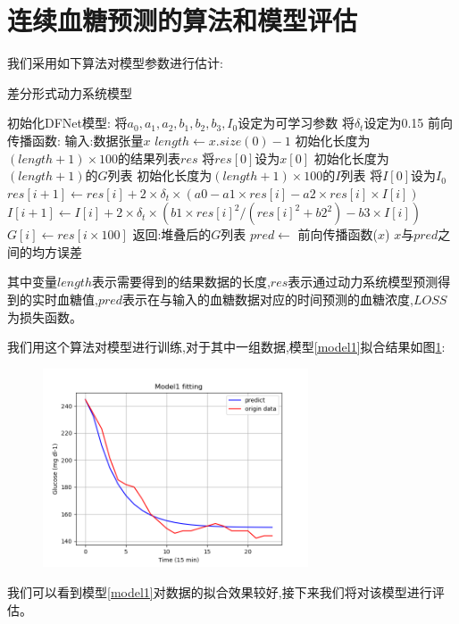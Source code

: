     
\section{连续血糖预测的算法和模型评估} 
我们采用如下算法对模型参数进行估计:
\begin{algorithm}[H]
    \caption{差分形式动力系统模型}
    \begin{algorithmic}[1]
    \State 初始化DFNet模型:
    \State \quad 将$a_0, a_1, a_2, b_1, b_2, b_3, I_0$设定为可学习参数
    \State \quad 将$\delta_t$设定为0.15
    \State 前向传播函数:
    \State \quad 输入:数据张量$x$
    \State \quad $length \gets x.size(0) - 1$
    \State \quad 初始化长度为$(length + 1) \times 100$的结果列表$res$
    \State \quad 将$res[0]$设为$x[0]$
    \State \quad 初始化长度为$(length + 1)$的$G$列表
    \State \quad 初始化长度为$(length + 1) \times 100$的$I$列表
    \State \quad 将$I[0]$设为$I_0$
        \State $res[i + 1] \gets res[i] + 2 \times \delta_t \times (a0 - a1 \times res[i] - a2 \times res[i] \times I[i])$
        \State $I[i + 1] \gets I[i] + 2 \times \delta_t \times (b1 \times res[i]^2 / (res[i]^2 + b2^2) - b3 \times I[i])$
    \EndFor
        \State $G[i] \gets res[i \times 100]$
    \EndFor
    \State 返回:堆叠后的$G$列表
    \State
        \State $pred \gets$ 前向传播函数($x$)
        \State \Return $x$与$pred$之间的均方误差
    \EndFunction
    \end{algorithmic}
    \end{algorithm}

    其中变量$length$表示需要得到的结果数据的长度,$res$表示通过动力系统模型预测得到的实时血糖值,$pred$表示在与输入的血糖数据对应的时间预测的血糖浓度,$LOSS$为损失函数。

    我们用这个算法对模型进行训练,对于其中一组数据,模型\ref{model1}拟合结果如图\ref{fig:fit_1}:

    \begin{figure}[H]
        \centering
        \includegraphics[width=0.7\textwidth]{Img/fit_1.png}
        \label{fig:fit_1}
    \end{figure}
    我们可以看到模型\ref{model1}对数据的拟合效果较好,接下来我们将对该模型进行评估。

